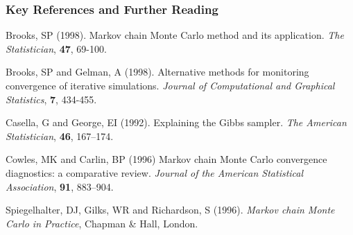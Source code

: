 \begin{frame}[t]

\frametitle{Key References and Further Reading}


Brooks, SP (1998). Markov chain Monte Carlo method and its
application. {\it The Statistician}, {\bf 47}, 69-100. \\ \vspace{2mm}

Brooks, SP and Gelman, A (1998). Alternative methods for
monitoring convergence of iterative simulations. {\it Journal of
Computational and Graphical Statistics}, {\bf 7}, 434-455. \\ \vspace{2mm}

Casella, G  and George, EI (1992). Explaining the Gibbs sampler.
{\it The American Statistician}, {\bf 46}, 167--174. \\ \vspace{2mm}

Cowles, MK and Carlin, BP (1996) Markov chain Monte Carlo
convergence diagnostics: a comparative review. {\it Journal of the
American Statistical Association}, {\bf 91}, 883--904. \\ \vspace{2mm}

Spiegelhalter, DJ, Gilks, WR and Richardson, S (1996). {\it Markov
chain Monte Carlo in Practice}, Chapman \& Hall, London. \\ %


\end{frame}
